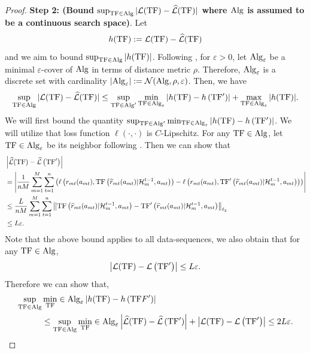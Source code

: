 \begin{proof}
\textbf{Step 2: (Bound $\sup _{\mathrm{TF} \in \mathrm{Alg}}|\mathcal{L}(\mathrm{TF})-\widehat{\mathcal{L}}(\mathrm{TF})|$ where $\mathrm{Alg}$ is assumed to be a continuous search space)}. Let 
$$
h(\mathrm{TF}):=\mathcal{L}(\mathrm{TF})-\widehat{\mathcal{L}}(\mathrm{TF})$$ 
and we aim to bound $\sup _{\mathrm{TF} \in \mathrm{Alg}}|h(\mathrm{TF})|$. Following , for $\varepsilon>0$, let $\mathrm{Alg}_{\varepsilon}$ be a minimal $\varepsilon$-cover of $\mathrm{Alg}$ in terms of distance metric $\rho$. Therefore, $\mathrm{Alg}_{\varepsilon}$ is a discrete set with cardinality $\left|\mathrm{Alg}_{\varepsilon}\right|:=\mathcal{N}(\mathrm{Alg}, \rho, \varepsilon)$. Then, we have
\begin{align*}
    \sup _{\mathrm{TF} \in \mathrm{Alg}}|\mathcal{L}(\mathrm{TF})-\widehat{\mathcal{L}}(\mathrm{TF})| \leq \sup _{\mathrm{TF} \in \mathrm{Alg}^{\prime}} \min _{\mathrm{TF} \in \mathrm{Alg}_{\varepsilon}}\left|h(\mathrm{TF})-h\left(\mathrm{TF}{ }^{\prime}\right)\right|+\max _{\mathrm{TF} \in \mathrm{Alg}_{\varepsilon}}|h(\mathrm{TF})| .
\end{align*}
We will first bound the quantity $\sup _{\mathrm{TF} \in \mathrm{Alg}^{\prime}} \min _{\mathrm{TF} \in \mathrm{Alg}_{\varepsilon}}\left|h(\mathrm{TF})-h\left(\mathrm{TF}{ }^{\prime}\right)\right|$.
%
We will utilize that loss function $\ell(\cdot, \cdot)$ is $C$-Lipschitz. For any $\mathrm{TF} \in \mathrm{Alg}$, let $\mathrm{TF} \in \mathrm{Alg}_{\varepsilon}$ be its neighbor following . Then 
we can show that
\begin{align*}
&\left|\widehat{\mathcal{L}}(\mathrm{TF})-\widehat{\mathcal{L}}\left(\mathrm{TF}^{\prime}\right)\right| \\
& =\left|\frac{1}{n M} \sum_{m=1}^M \sum_{t=1}^n\left(\ell\left(r_{mt}(a_{mt}), \mathrm{TF}\left(\widehat{r}_{mt}(a_{mt})|\mathcal{H}_m^{t-1}, a_{m t}\right)\right)-\ell\left(r_{mt}(a_{mt}), \mathrm{TF}'\left(\widehat{r}_{mt}(a_{mt})|\mathcal{H}_m^{t-1}, a_{m t}\right)\right)\right)\right| \\
& \leq \frac{L}{n M} \sum_{m=1}^M \sum_{t=1}^n\left\|\mathrm{TF}\left(\widehat{r}_{mt}(a_{mt})|\mathcal{H}_m^{t-1}, a_{m t}\right)-\mathrm{TF}'\left(\widehat{r}_{mt}(a_{mt})|\mathcal{H}_m^{t-1}, a_{m t}\right)\right\|_{\ell_2} \\
& \leq L \varepsilon .
\end{align*}
Note that the above bound applies to all data-sequences, we also obtain that for any $\mathrm{TF} \in \mathrm{Alg}$,
$$
\left|\mathcal{L}(\mathrm{TF})-\mathcal{L}\left(\mathrm{TF}^{\prime}\right)\right| \leq L \varepsilon .
$$
Therefore we can show that,
\begin{align}
    \sup _{\mathrm{TF} \in \mathrm{Alg}} &\min _{\mathrm{TF}} \in \mathrm{Alg}_{\varepsilon}\left|h(\mathrm{TF})-h\left(\mathrm{TF} F^{\prime}\right)\right| \nonumber\\
    &\leq \sup _{\mathrm{TF} \in \mathrm{Alg}} \min _{\mathrm{TF}} \in \mathrm{Alg}_{\varepsilon}\left|\widehat{\mathcal{L}}(\mathrm{TF})-\widehat{\mathcal{L}}\left(\mathrm{TF}{ }^{\prime}\right)\right|+\left|\mathcal{L}(\mathrm{TF})-\mathcal{L}\left(\mathrm{TF}^{\prime}\right)\right| \leq 2 L \varepsilon . \label{eq:perturbation-bound}
\end{align}


\end{proof}
